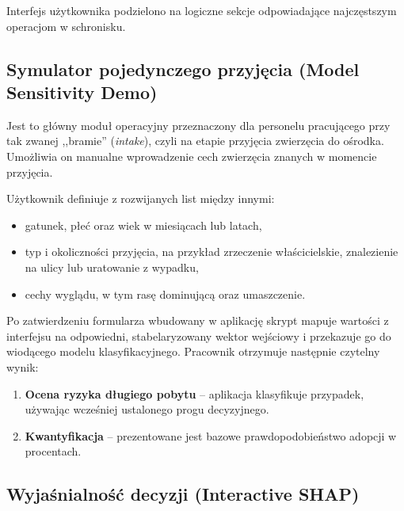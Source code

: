 Interfejs użytkownika podzielono na logiczne sekcje odpowiadające najczęstszym operacjom w schronisku.

\subsection{Symulator pojedynczego przyjęcia (Model Sensitivity Demo)}
\label{subsec:single-animal-predictor}

Jest to główny moduł operacyjny przeznaczony dla personelu pracującego przy tak zwanej ,,bramie'' (\emph{intake}), czyli na etapie przyjęcia zwierzęcia do ośrodka. Umożliwia on manualne wprowadzenie cech zwierzęcia znanych w momencie przyjęcia.

Użytkownik definiuje z rozwijanych list między innymi:

\begin{itemize}
    \item gatunek, płeć oraz wiek w miesiącach lub latach,
    \item typ i okoliczności przyjęcia, na przykład zrzeczenie właścicielskie, znalezienie na ulicy lub uratowanie z wypadku,
    \item cechy wyglądu, w tym rasę dominującą oraz umaszczenie.
\end{itemize}

Po zatwierdzeniu formularza wbudowany w aplikację skrypt mapuje wartości z interfejsu na odpowiedni, stabelaryzowany wektor wejściowy i przekazuje go do wiodącego modelu klasyfikacyjnego. Pracownik otrzymuje następnie czytelny wynik:

\begin{enumerate}
    \item \textbf{Ocena ryzyka długiego pobytu} -- aplikacja klasyfikuje przypadek, używając wcześniej ustalonego progu decyzyjnego.
    \item \textbf{Kwantyfikacja} -- prezentowane jest bazowe prawdopodobieństwo adopcji w procentach.
\end{enumerate}


\subsection{Wyjaśnialność decyzji (Interactive SHAP)}
\label{subsec:wyjasnialnosc-decyzji-interactive-shap}

